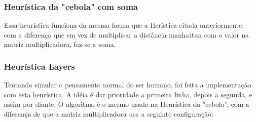 \documentclass[a4paper,11pt]{article}
\begin{document}
\subsubsection {Heurística da "cebola" com soma}
Essa heurística funciona da mesma forma que a Herística citada anteriormente, com a diferença que em vez de multiplicar a distância manhattan com o valor na matriz multiplicadora, faz-se a soma.

\subsubsection {Heurística Layers}
Tentando simular o pensamento normal do ser humano, foi feita a implementação com esta heurística.
A idéia é dar prioridade a primeira linha, depois a segunda, e assim por diante.
O algoritmo é o mesmo usada na Heurística da "cebola", com a diferença de que a matriz multiplicadora usa a seguinte configuração:
\end{document}
